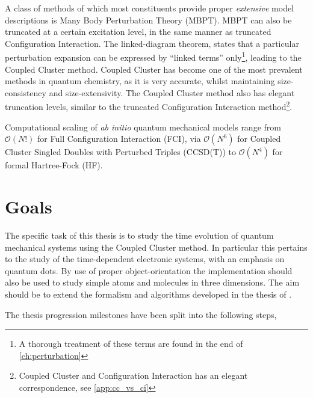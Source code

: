     A class of methods of which most constituents provide proper \emph{extensive} model
    descriptions is Many Body Perturbation Theory (MBPT)\cite{brueckner1955approximate}.
    MBPT can also be truncated at a certain 
    excitation level, in the same manner as truncated Configuration Interaction. 
    The linked-diagram theorem\cite{goldstone1957derivation}, states that a 
    particular perturbation expansion can be expressed by ``linked terms''
    only\footnote{A thorough treatment of these terms are found in the end of
    \autoref{ch:perturbation}},
    leading to the Coupled Cluster method\cite{coester1958bound,coester1960short}.
    Coupled Cluster has become one of the most prevalent methods in quantum chemistry,
    as it is very accurate, whilst maintaining size-consistency and size-extensivity.
    The Coupled Cluster method also has elegant truncation levels, similar to the 
    truncated Configuration Interaction method\footnote{Coupled Cluster and
    Configuration Interaction has an elegant correspondence,
    see \autoref{app:cc_vs_ci}}.

    Computational scaling of \emph{ab initio} quantum mechanical models range from 
    $\mathcal{O}(N!)$ for Full Configuration Interaction (FCI), via $\mathcal{O}(N^6)$ 
    for Coupled Cluster Singled Doubles with Perturbed Triples (CCSD(T)) to 
    $\mathcal{O}(N^4)$ for formal Hartree-Fock (HF)\cite{ratcliff2017challenges}.


\section{Goals}

    The specific task of this thesis is to study the time evolution of quantum 
    mechanical systems using the Coupled Cluster method. In particular this 
    pertains to the study of the time-dependent electronic systems, with an emphasis 
    on quantum dots. By use of proper object-orientation the implementation should 
    also be used to study simple atoms and molecules in three dimensions.
    The aim should be to 
    extend the formalism and algorithms developed in the thesis of 
    \citeauthor{haakon2017time}\cite{haakon2017time}.

    The thesis progression milestones have been split into the following steps,

